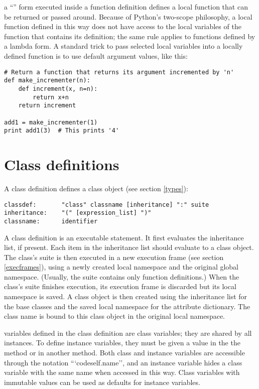  a ``'' form executed inside a
function definition defines a local function that can be returned or
passed around.  Because of Python's two-scope philosophy, a local
function defined in this way does not have access to the local
variables of the function that contains its definition; the same rule
applies to functions defined by a lambda form.  A standard trick to
pass selected local variables into a locally defined function is to
use default argument values, like this:

\begin{verbatim}
# Return a function that returns its argument incremented by 'n'
def make_incrementer(n):
    def increment(x, n=n):
        return x+n
    return increment

add1 = make_incrementer(1)
print add1(3)  # This prints '4'
\end{verbatim}

\section{Class definitions\label{class}}

A class definition defines a class object (see section \ref{types}):

\begin{verbatim}
classdef:       "class" classname [inheritance] ":" suite
inheritance:    "(" [expression_list] ")"
classname:      identifier
\end{verbatim}

A class definition is an executable statement.  It first evaluates the
inheritance list, if present.  Each item in the inheritance list
should evaluate to a class object.  The class's suite is then executed
in a new execution frame (see section \ref{execframes}), using a newly
created local namespace and the original global namespace.
(Usually, the suite contains only function definitions.)  When the
class's suite finishes execution, its execution frame is discarded but
its local namespace is saved.  A class object is then created using
the inheritance list for the base classes and the saved local
namespace for the attribute dictionary.  The class name is bound to this
class object in the original local namespace.

 variables defined in the class definition
are class variables; they are shared by all instances.  To define
instance variables, they must be given a value in the the
 method or in another method.  Both class and
instance variables are accessible through the notation
```code{self.name}'', and an instance variable hides a class variable
with the same name when accessed in this way.  Class variables with
immutable values can be used as defaults for instance variables.
